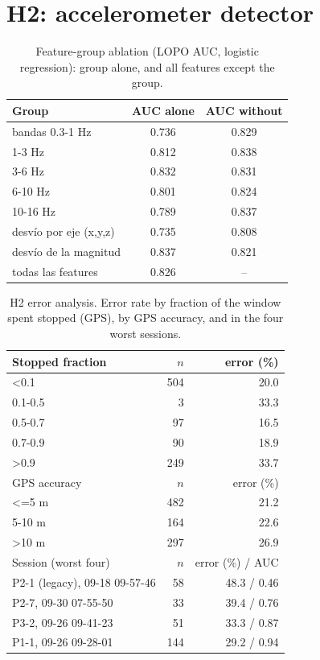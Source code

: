 \documentclass[runningheads]{llncs}
\begin{document}
\section{H2: accelerometer detector}
\begin{table}[h]
\caption{Feature-group ablation (LOPO AUC, logistic regression): group alone, and all features except the group.}
\footnotesize\centering
\begin{tabular}{@{}lcc@{}}
\toprule
Group & AUC alone & AUC without\\
\midrule
bandas 0.3-1 Hz & 0.736 & 0.829\\
1-3 Hz & 0.812 & 0.838\\
3-6 Hz & 0.832 & 0.831\\
6-10 Hz & 0.801 & 0.824\\
10-16 Hz & 0.789 & 0.837\\
desvío por eje (x,y,z) & 0.735 & 0.808\\
desvío de la magnitud & 0.837 & 0.821\\
todas las features & 0.826 & --\\
\bottomrule
\end{tabular}
\end{table}

\begin{table}[h]
\caption{H2 error analysis. Error rate by fraction of the window spent stopped (GPS), by GPS accuracy, and in the four worst sessions.}
\footnotesize\centering
\begin{tabular}{@{}lrr@{}}
\toprule
Stopped fraction & $n$ & error (\%)\\
\midrule
<0.1 & 504 & 20.0\\
0.1-0.5 & 3 & 33.3\\
0.5-0.7 & 97 & 16.5\\
0.7-0.9 & 90 & 18.9\\
>0.9 & 249 & 33.7\\
\midrule
GPS accuracy & $n$ & error (\%)\\
\midrule
<=5 m & 482 & 21.2\\
5-10 m & 164 & 22.6\\
>10 m & 297 & 26.9\\
\midrule
Session (worst four) & $n$ & error (\%) / AUC\\
\midrule
P2-1 (legacy), 09-18 09-57-46 & 58 & 48.3 / 0.46\\
P2-7, 09-30 07-55-50 & 33 & 39.4 / 0.76\\
P3-2, 09-26 09-41-23 & 51 & 33.3 / 0.87\\
P1-1, 09-26 09-28-01 & 144 & 29.2 / 0.94\\
\bottomrule
\end{tabular}
\end{table}
\end{document}
